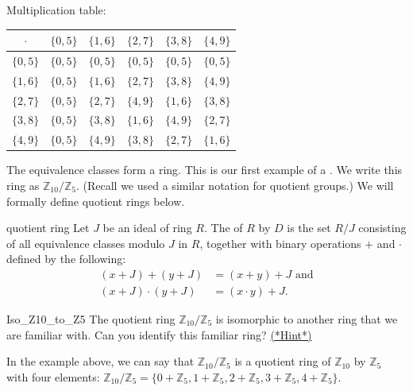\begin{example}{}
Multiplication table:

\begin{center}
\begin{tabular}{c|c|c|c|c|c}
$\cdot$ & $\{0,5\}$ & $\{1,6\}$ & $\{2,7\}$ & $\{3,8\}$ & $\{4,9\}$ \\
\hline
$\{0,5\}$ & $\{0,5\}$ & $\{0,5\}$ & $\{0,5\}$ & $\{0,5\}$ & $\{0,5\}$ \\
\hline
$\{1,6\}$ & $\{0,5\}$ & $\{1,6\}$ & $\{2,7\}$ & $\{3,8\}$ & $\{4,9\}$ \\
\hline
$\{2,7\}$ & $\{0,5\}$ & $\{2,7\}$ & $\{4,9\}$ & $\{1,6\}$ & $\{3,8\}$ \\
\hline
$\{3,8\}$ & $\{0,5\}$ & $\{3,8\}$ & $\{1,6\}$ & $\{4,9\}$ & $\{2,7\}$ \\
\hline
$\{4,9\}$ & $\{0,5\}$ & $\{4,9\}$ & $\{3,8\}$ & $\{2,7\}$ & $\{1,6\}$ \\
\end{tabular}
\end{center}
\end{example}

The equivalence classes form a ring.  This is our first example of a .  We write this ring as ${\mathbb Z}_{10}/{\mathbb Z}_5$.  (Recall we used a similar notation for quotient groups.)  We will formally define quotient rings below.

\begin{defn}{quotient ring}
Let $J$ be an ideal of ring $R$.  The  of $R$ by $D$ is the set $R/J$ consisting of all equivalence classes modulo $J$ in $R$, together with binary operations $+$ and $\cdot$ defined by the following:
\begin{align*}
(x+J)+(y+J)&=(x+y)+J \text{ and}\\
(x+J)\cdot(y+J)&=(x\cdot y)+J.
\end{align*}
\end{defn}

\begin{exercise}{Iso_Z10_to_Z5}
The quotient ring ${\mathbb Z}_{10}/{\mathbb Z}_5$ is isomorphic to another ring that we are familiar with. Can you identify this familiar ring?  \hyperref[sec:Rings:Hints]{(*Hint*)} 
\end{exercise}

In the example above, we can say that ${\mathbb Z}_{10}/{\mathbb Z}_5$ is a quotient ring of ${\mathbb Z}_{10}$ by ${\mathbb Z}_5$ with four elements:
${\mathbb Z}_{10}/{\mathbb Z}_5=\{0+{\mathbb Z}_5, 1+{\mathbb Z}_5, 2+{\mathbb Z}_5, 3+{\mathbb Z}_5, 4+{\mathbb Z}_5\}$.

